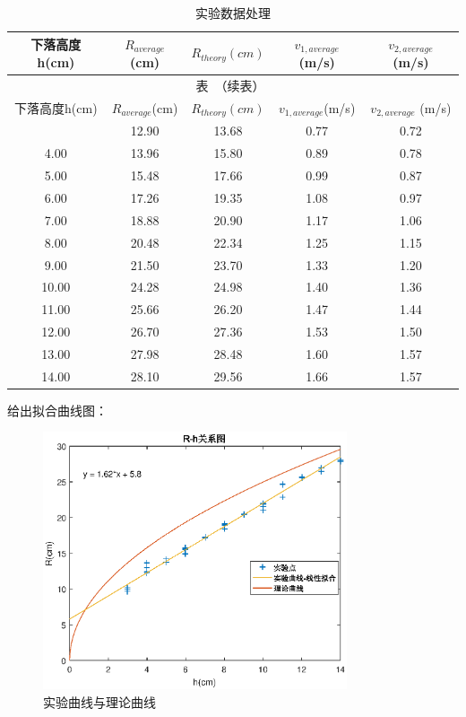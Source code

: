\begin{longtable}{ccccc}%
	\caption{\wuhao 实验数据处理}\\[0.3em]
	\toprule[1.5pt] 下落高度h(cm) & $R_{average}$(cm) & $R_{theory}(cm) $ & $v_{1,average}$(m/s) & $v_{2,average}$ (m/s) \\ \midrule[1pt]
	\endfirsthead
	\multicolumn{3}{r}{表~\thetable（续表）}\vspace{0.5em}\\
	\toprule[1.5pt] 下落高度h(cm) & $R_{average}$(cm) & $R_{theory}(cm) $ & $v_{1,average}$(m/s) & $v_{2,average}$ (m/s) \\ \midrule[1pt]
	\endhead
	\bottomrule[1.5pt]
	\endfoot
    3.00  & 12.90  & 13.68  & 0.77  & 0.72  \\
    4.00  & 13.96  & 15.80  & 0.89  & 0.78  \\
    5.00  & 15.48  & 17.66  & 0.99  & 0.87  \\
    6.00  & 17.26  & 19.35  & 1.08  & 0.97  \\
    7.00  & 18.88  & 20.90  & 1.17  & 1.06  \\
    8.00  & 20.48  & 22.34  & 1.25  & 1.15  \\
    9.00  & 21.50  & 23.70  & 1.33  & 1.20  \\
    10.00  & 24.28  & 24.98  & 1.40  & 1.36  \\
    11.00  & 25.66  & 26.20  & 1.47  & 1.44  \\
    12.00  & 26.70  & 27.36  & 1.53  & 1.50  \\
    13.00  & 27.98  & 28.48  & 1.60  & 1.57  \\
    14.00  & 28.10  & 29.56  & 1.66  & 1.57  \\
\end{longtable}\normalsize

\par
给出拟合曲线图：
\begin{figure}[h]
    \centering
    \includegraphics[width = 0.8\textwidth]{01}
    \caption{实验曲线与理论曲线}
\end{figure}

